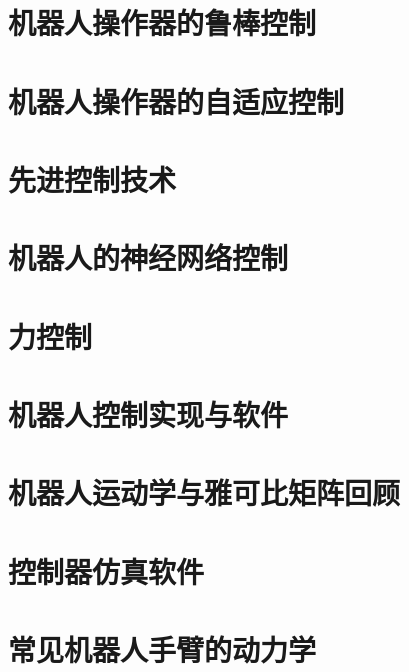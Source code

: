 \documentclass[UTF8,a4paper,12pt]{ctexbook}
\theoremstyle{definition}
\begin{document}
\chapter{机器人操作器的鲁棒控制}


\chapter{机器人操作器的自适应控制}


\chapter{先进控制技术}


\chapter{机器人的神经网络控制}


\chapter{力控制}


\chapter{机器人控制实现与软件}


\appendix
\chapter{机器人运动学与雅可比矩阵回顾}


\chapter{控制器仿真软件}


\chapter{常见机器人手臂的动力学}


\backmatter
\end{document}
